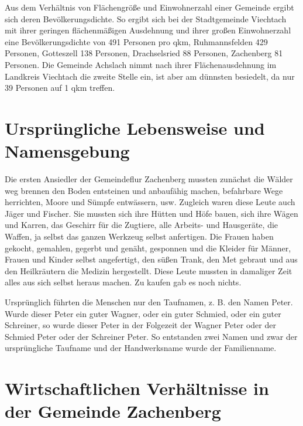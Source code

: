 \documentclass{book}
\begin{document}
Aus dem Verhältnis von Flächengröße und Einwohnerzahl einer Gemeinde ergibt sich
deren Bevölkerungsdichte. So ergibt sich bei der Stadtgemeinde Viechtach mit
ihrer geringen flächenmäßigen Ausdehnung und ihrer großen Einwohnerzahl eine
Bevölkerungsdichte von 491 Personen pro qkm, Ruhmannsfelden 429 Personen,
Gotteszell 138 Personen, Drachselsried 88 Personen, Zachenberg 81 Personen. Die
Gemeinde Achslach nimmt nach ihrer Flächenausdehnung im Landkreis Viechtach die
zweite Stelle ein, ist aber am dünnsten besiedelt, da nur 39 Personen auf 1 qkm
treffen.

\section{Ursprüngliche Lebensweise und Namensgebung}

Die ersten Ansiedler der Gemeindeflur Zachenberg mussten zunächst die Wälder weg
brennen den Boden entsteinen und anbaufähig machen, befahrbare Wege herrichten,
Moore und Sümpfe entwässern, usw. Zugleich waren diese Leute auch Jäger und
Fischer. Sie mussten sich ihre Hütten und Höfe bauen, sich ihre Wägen und
Karren, das Geschirr für die Zugtiere, alle Arbeits- und Hausgeräte, die Waffen,
ja selbst das ganzen Werkzeug selbst anfertigen. Die Frauen haben gekocht,
gemahlen, gegerbt und genäht, gesponnen und die Kleider für Männer, Frauen und
Kinder selbst angefertigt, den süßen Trank, den Met gebraut und aus den
Heilkräutern die Medizin hergestellt. Diese Leute mussten in damaliger Zeit
alles aus sich selbst heraus machen. Zu kaufen gab es noch nichts.

Ursprünglich führten die Menschen nur den Taufnamen, z. B. den Namen Peter.
Wurde dieser Peter ein guter Wagner, oder ein guter Schmied, oder ein guter
Schreiner, so wurde dieser Peter in der Folgezeit der Wagner Peter oder der
Schmied Peter oder der Schreiner Peter. So entstanden zwei Namen und zwar der
ursprüngliche Taufname und der Handwerksname wurde der Familienname.

\section{Wirtschaftlichen Verhältnisse in der Gemeinde Zachenberg}
\end{document}
